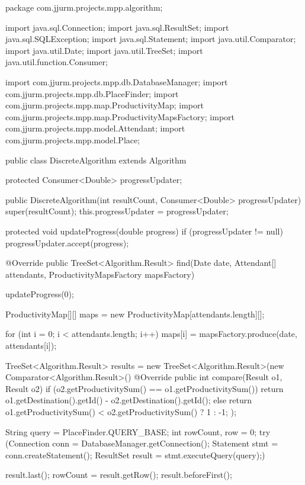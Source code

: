\begin{javacode}
package com.jjurm.projects.mpp.algorithm;

import java.sql.Connection;
import java.sql.ResultSet;
import java.sql.SQLException;
import java.sql.Statement;
import java.util.Comparator;
import java.util.Date;
import java.util.TreeSet;
import java.util.function.Consumer;

import com.jjurm.projects.mpp.db.DatabaseManager;
import com.jjurm.projects.mpp.db.PlaceFinder;
import com.jjurm.projects.mpp.map.ProductivityMap;
import com.jjurm.projects.mpp.map.ProductivityMapsFactory;
import com.jjurm.projects.mpp.model.Attendant;
import com.jjurm.projects.mpp.model.Place;

public class DiscreteAlgorithm extends Algorithm {

  protected Consumer<Double> progressUpdater;

  public DiscreteAlgorithm(int resultCount, Consumer<Double> progressUpdater) {
    super(resultCount);
    this.progressUpdater = progressUpdater;
  }

  protected void updateProgress(double progress) {
    if (progressUpdater != null) {
      progressUpdater.accept(progress);
    }
  }

  @Override
  public TreeSet<Algorithm.Result> find(Date date, Attendant[] attendants,
      ProductivityMapsFactory mapsFactory) {

    updateProgress(0);

    ProductivityMap[][] maps = new ProductivityMap[attendants.length][];

    for (int i = 0; i < attendants.length; i++) {
      maps[i] = mapsFactory.produce(date, attendants[i]);
    }

    TreeSet<Algorithm.Result> results =
        new TreeSet<Algorithm.Result>(new Comparator<Algorithm.Result>() {
          @Override
          public int compare(Result o1, Result o2) {
            if (o2.getProductivitySum() == o1.getProductivitySum())
              return o1.getDestination().getId() - o2.getDestination().getId();
            else
              return o1.getProductivitySum() < o2.getProductivitySum() ? 1 : -1;
          }
        });

    String query = PlaceFinder.QUERY_BASE;
    int rowCount, row = 0;
    try (Connection conn = DatabaseManager.getConnection();
        Statement stmt = conn.createStatement();
        ResultSet result = stmt.executeQuery(query);) {

      result.last();
      rowCount = result.getRow();
      result.beforeFirst();

}}}
\end{javacode}
